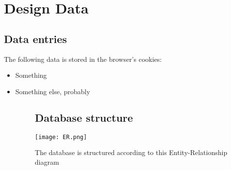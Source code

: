 \section{Design Data}

\subsection{Data entries}
The following data is stored in the browser's cookies:
\begin{itemize}
  \item Something
  \item Something else, probably

\begin{figure}[h!]
\subsection{Database structure}
  \centering
  \texttt{[image: ER.png]}
  \caption{The database is structured according to this Entity-Relationship diagram}
\end{figure}
\end{itemize}
